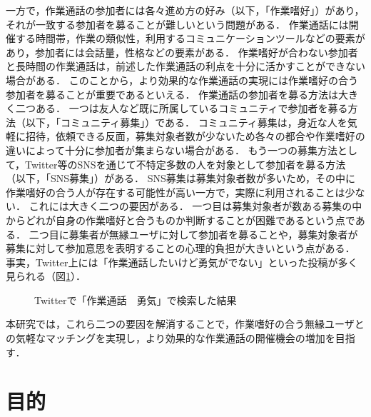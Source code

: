 一方で，作業通話の参加者には各々進め方の好み（以下，「作業嗜好」）があり，それが一致する参加者を募ることが難しいという問題がある．
作業通話には開催する時間帯，作業の類似性，利用するコミュニケーションツールなどの要素があり，参加者には会話量，性格などの要素がある．
作業嗜好が合わない参加者と長時間の作業通話は，前述した作業通話の利点を十分に活かすことができない場合がある．
このことから，より効果的な作業通話の実現には作業嗜好の合う参加者を募ることが重要であるといえる．
作業通話の参加者を募る方法は大きく二つある．
一つは友人など既に所属しているコミュニティで参加者を募る方法（以下，「コミュニティ募集」）である．
コミュニティ募集は，身近な人を気軽に招待，依頼できる反面，募集対象者数が少ないため各々の都合や作業嗜好の違いによって十分に参加者が集まらない場合がある．
もう一つの募集方法として，Twitter\cite{Twitter}等のSNSを通じて不特定多数の人を対象として参加者を募る方法（以下，「SNS募集」）がある．
SNS募集は募集対象者数が多いため，その中に作業嗜好の合う人が存在する可能性が高い一方で，実際に利用されることは少ない．
これには大きく二つの要因がある．
一つ目は募集対象者が数ある募集の中からどれが自身の作業嗜好と合うものか判断することが困難であるという点である．
二つ目に募集者が無縁ユーザに対して参加者を募ることや，募集対象者が募集に対して参加意思を表明することの心理的負担が大きいという点がある．
事実，Twitter上には「作業通話したいけど勇気がでない」といった投稿が多く見られる（図\ref{fig:search_results}）．

\begin{figure}
    \centering
    \caption{Twitterで「作業通話　勇気」で検索した結果}
    \label{fig:search_results}
\end{figure}

本研究では，これら二つの要因を解消することで，作業嗜好の合う無縁ユーザとの気軽なマッチングを実現し，より効果的な作業通話の開催機会の増加を目指す．

\section{目的}

